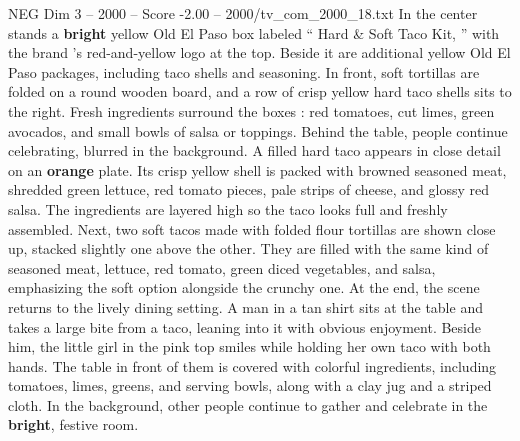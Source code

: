 \begin{textsample}{NEG Dim 3 – 2000 – Score -2.00 – 2000/tv\_com\_2000\_18.txt}
In the center stands a \textbf{bright} yellow Old El Paso box labeled “ Hard \& Soft Taco Kit, ” with the brand ’s red-and-yellow logo at the top.
Beside it are additional yellow Old El Paso packages, including taco shells and seasoning.
In front, soft tortillas are folded on a round wooden board, and a row of crisp yellow hard taco shells sits to the right.
Fresh ingredients surround the boxes : red tomatoes, cut limes, green avocados, and small bowls of salsa or toppings.
Behind the table, people continue celebrating, blurred in the background.
A filled hard taco appears in close detail on an \textbf{orange} plate.
Its crisp yellow shell is packed with browned seasoned meat, shredded green lettuce, red tomato pieces, pale strips of cheese, and glossy red salsa.
The ingredients are layered high so the taco looks full and freshly assembled.
Next, two soft tacos made with folded flour tortillas are shown close up, stacked slightly one above the other.
They are filled with the same kind of seasoned meat, lettuce, red tomato, green diced vegetables, and salsa, emphasizing the soft option alongside the crunchy one.
At the end, the scene returns to the lively dining setting.
A man in a tan shirt sits at the table and takes a large bite from a taco, leaning into it with obvious enjoyment.
Beside him, the little girl in the pink top smiles while holding her own taco with both hands.
The table in front of them is covered with colorful ingredients, including tomatoes, limes, greens, and serving bowls, along with a clay jug and a striped cloth.
In the background, other people continue to gather and celebrate in the \textbf{bright}, festive room.

\end{textsample}
